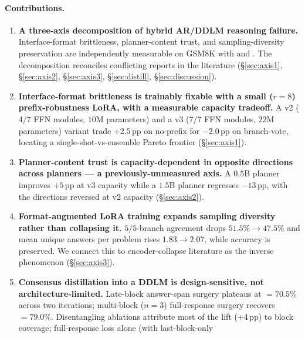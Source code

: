 \clearpage
\paragraph{Contributions.}
\begin{enumerate}
    \item \textbf{A three-axis decomposition of hybrid AR/DDLM
          reasoning failure.}  Interface-format brittleness,
          planner-content trust, and sampling-diversity preservation
          are independently measurable on GSM8K with \LLaDA{} and
          .  The decomposition reconciles
          conflicting reports in the literature
          (\S\ref{sec:axis1}, \S\ref{sec:axis2}, \S\ref{sec:axis3},
          \S\ref{sec:distill}, \S\ref{sec:discussion}).
    \item \textbf{Interface-format brittleness is trainably fixable
          with a small ($r{=}8$) prefix-robustness LoRA, with a
          measurable capacity tradeoff.}  A v2 ($4/7$ FFN modules,
          $10$M parameters) and a v3 ($7/7$ FFN modules, $22$M
          parameters) variant trade $+2.5$\,pp on no-prefix \ctwo{}
          for $-2.0$\,pp on \cmaj{} branch-vote, locating a
          single-shot-vs-ensemble Pareto frontier
          (\S\ref{sec:axis1}).
    \item \textbf{Planner-content trust is capacity-dependent in
          opposite directions across planners --- a
          previously-unmeasured axis.}  A $0.5$B planner improves
          $+5$\,pp at v3 capacity while a $1.5$B planner regresses
          $-13$\,pp, with the directions reversed at v2 capacity
          (\S\ref{sec:axis2}).
    \item \textbf{Format-augmented LoRA training expands sampling
          diversity rather than collapsing it.}  $5/5$-branch
          agreement drops $51.5\% \to 47.5\%$ and mean unique
          answers per problem rises $1.83 \to 2.07$, while \cmaj{}
          accuracy is preserved.  We connect this to encoder-collapse
          literature as the inverse phenomenon
          (\S\ref{sec:axis3}).
    \item \textbf{Consensus distillation into a DDLM is
          design-sensitive, not architecture-limited.}  Late-block
          answer-span surgery plateaus at \ctwoc{}$=70.5\%$ across
          two iterations; multi-block ($n{=}3$) full-response
          surgery recovers \ctwoc{}$=79.0\%$.  Disentangling
          ablations attribute most of the lift ($+4$\,pp) to block
          coverage; full-response loss alone (with last-block-only

\end{enumerate}
